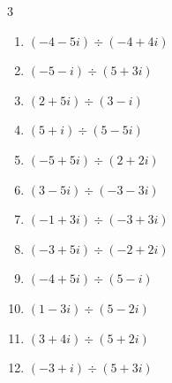 \begin{multicols}{3}
\begin{enumerate}
\columnbreak %

  \item $\displaystyle (-4-5i)\div(-4+4i)$


  \item $\displaystyle (-5-i)\div(5+3i)$


  \item $\displaystyle (2+5i)\div(3-i)$


  \item $\displaystyle (5+i)\div(5-5i)$


  \item $\displaystyle (-5+5i)\div(2+2i)$


  \item $\displaystyle (3-5i)\div(-3-3i)$


  \item $\displaystyle (-1+3i)\div(-3+3i)$


  \item $\displaystyle (-3+5i)\div(-2+2i)$


  \item $\displaystyle (-4+5i)\div(5-i)$


  \item $\displaystyle (1-3i)\div(5-2i)$


\columnbreak %

  \item $\displaystyle (3+4i)\div(5+2i)$


  \item $\displaystyle (-3+i)\div(5+3i)$


\end{enumerate}
\end{multicols}
